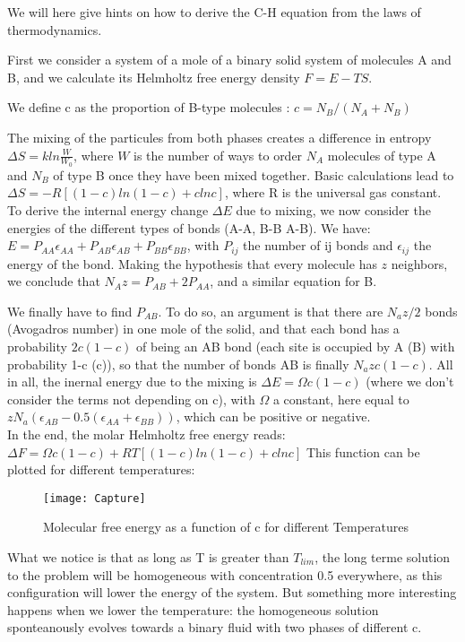 \documentclass[11pt,a4paper]{report}
\begin{document}
We will here give hints on how to derive the C-H equation from the laws of thermodynamics.

First we consider a system of a mole of a binary solid system of molecules A and B, and we calculate its Helmholtz free energy density $F=E-TS$.

We define c as the proportion of B-type molecules : $c=N_B/(N_A+N_B)$

The mixing of the particules from both phases creates a difference in entropy $\Delta S=kln\frac{W}{W_0}$, where $W$ is the number of ways to order $N_A$ molecules of type A and $N_B$ of type B once they have been mixed together. Basic calculations lead to $\Delta S=-R[(1-c)ln(1-c)+c  ln c]$, where R is the universal gas constant.\\

To derive the internal energy change $\Delta E$ due to mixing, we now consider the energies of the different types of bonds (A-A, B-B A-B). 
We have: $E=P_{AA}\epsilon_{AA}+P_{AB}\epsilon_{AB}+P_{BB}\epsilon_{BB}$, with $P_{ij}$ the number of ij bonds and $\epsilon_{ij}$ the energy of the bond. Making the hypothesis that every molecule has $z$ neighbors, we conclude that $N_Az=P_{AB}+2P_{AA}$, and a similar equation for B.

We finally have to find $P_{AB}$. To do so, an argument is that there are $N_az/2$ bonds (Avogadros number) in one mole of the solid, and that each bond has a probability $2c(1-c)$ of being an AB bond (each site is occupied by A (B) with probability 1-c (c)), so that the number of bonds AB is finally $N_azc(1-c)$. All in all, the inernal energy due to the mixing is $\Delta E=\Omega c(1-c)$ (where we don't consider the terms not depending on c), with $\Omega$ a constant, here equal to $zN_a(\epsilon_{AB}-0.5(\epsilon_{AA}+\epsilon_{BB}))$, which can be positive or negative.\\

In the end, the molar Helmholtz free energy reads: $\Delta F=\Omega c(1-c)+RT[(1-c)ln(1-c)+c  ln c]$
This function can be plotted for different temperatures:
\begin{figure}[h!]
\centering
\texttt{[image: Capture]}
\caption{Molecular free energy as a function of c for different Temperatures}
\end{figure}

What we notice is that as long as T is greater than $T_{lim}$, the long terme solution to the problem will be homogeneous with concentration 0.5 everywhere, as this configuration will lower the energy of the system. But something more interesting happens when we lower the temperature: the homogeneous solution sponteanously evolves towards a binary fluid with two phases of different c.\\
\end{document}
